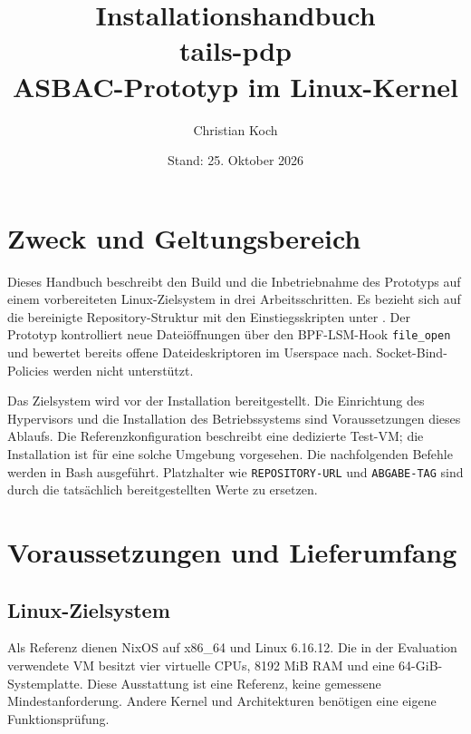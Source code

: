 \documentclass[12pt,a4paper]{article}
\title{Installationshandbuch\\tails-pdp\\\large ASBAC-Prototyp im Linux-Kernel}
\author{Christian Koch}
\date{Stand: 25. Oktober 2026}
\begin{document}
\hypersetup{pageanchor=false}
\maketitle
\thispagestyle{empty}

\clearpage
{}
\hypersetup{pageanchor=true}
\tableofcontents

\clearpage
{}

\section{Zweck und Geltungsbereich}
Dieses Handbuch beschreibt den Build und die Inbetriebnahme des Prototyps auf einem
vorbereiteten Linux-Zielsystem in drei Arbeitsschritten. Es bezieht sich auf die
bereinigte Repository-Struktur mit den Einstiegsskripten unter .
Der Prototyp kontrolliert neue Dateiöffnungen über den BPF-LSM-Hook
\texttt{file\_open} und bewertet bereits offene Dateideskriptoren im Userspace nach.
Socket-Bind-Policies werden nicht unterstützt.

Das Zielsystem wird vor der Installation bereitgestellt. Die Einrichtung des
Hypervisors und die Installation des Betriebssystems sind Voraussetzungen dieses
Ablaufs. Die Referenzkonfiguration beschreibt eine dedizierte Test-VM; die
Installation ist für eine solche Umgebung vorgesehen. Die nachfolgenden Befehle
werden in Bash ausgeführt. Platzhalter wie \texttt{REPOSITORY-URL} und
\texttt{ABGABE-TAG} sind durch die tatsächlich bereitgestellten Werte zu ersetzen.

\section{Voraussetzungen und Lieferumfang}
\subsection{Linux-Zielsystem}
Als Referenz dienen NixOS auf x86\_64 und Linux 6.16.12. Die in der Evaluation
verwendete VM besitzt vier virtuelle CPUs, 8192 MiB RAM und eine 64-GiB-Systemplatte.
Diese Ausstattung ist eine Referenz, keine gemessene Mindestanforderung.
Andere Kernel und Architekturen benötigen eine eigene Funktionsprüfung.
\end{document}
